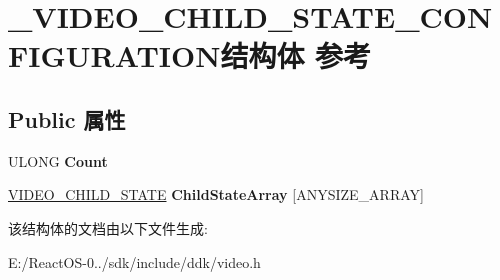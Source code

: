 \hypertarget{struct___v_i_d_e_o___c_h_i_l_d___s_t_a_t_e___c_o_n_f_i_g_u_r_a_t_i_o_n}{}\section{\+\_\+\+V\+I\+D\+E\+O\+\_\+\+C\+H\+I\+L\+D\+\_\+\+S\+T\+A\+T\+E\+\_\+\+C\+O\+N\+F\+I\+G\+U\+R\+A\+T\+I\+O\+N结构体 参考}
\label{struct___v_i_d_e_o___c_h_i_l_d___s_t_a_t_e___c_o_n_f_i_g_u_r_a_t_i_o_n}
\subsection*{Public 属性}
\begin{DoxyCompactItemize}
\item 
\mbox{\label{struct___v_i_d_e_o___c_h_i_l_d___s_t_a_t_e___c_o_n_f_i_g_u_r_a_t_i_o_n_a637bfc20a585c1e913e5c973f33ac81c}} 
U\+L\+O\+NG {\bfseries Count}
\item 
\mbox{\label{struct___v_i_d_e_o___c_h_i_l_d___s_t_a_t_e___c_o_n_f_i_g_u_r_a_t_i_o_n_a443980b52b44808ff6477833bb32f3ba}} 
\hyperlink{struct___v_i_d_e_o___c_h_i_l_d___s_t_a_t_e}{V\+I\+D\+E\+O\+\_\+\+C\+H\+I\+L\+D\+\_\+\+S\+T\+A\+TE} {\bfseries Child\+State\+Array} \mbox{[}A\+N\+Y\+S\+I\+Z\+E\+\_\+\+A\+R\+R\+AY\mbox{]}
\end{DoxyCompactItemize}


该结构体的文档由以下文件生成\+:\begin{DoxyCompactItemize}
\item 
E\+:/\+React\+O\+S-\/0../sdk/include/ddk/video.\+h\end{DoxyCompactItemize}
